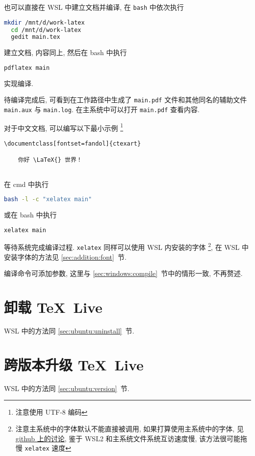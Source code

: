 也可以直接在 WSL 中建立文档并编译,
在 \texttt{bash} 中依次执行
\begin{lstlisting}[language=bash]
  mkdir /mnt/d/work-latex
  cd /mnt/d/work-latex
  gedit main.tex
\end{lstlisting}
建立文档,
内容同上,
然后在 \textsf{bash} 中执行
\begin{lstlisting}[language=bash]
  pdflatex main
\end{lstlisting}
实现编译.

待编译完成后, 可看到在工作路径中生成了 \texttt{main.pdf}
文件和其他同名的辅助文件 \texttt{main.aux} 与 \texttt{main.log}.
在主系统中可以打开 \texttt{main.pdf} 查看内容.

对于中文文档,
可以编写以下最小示例%
\footnote{注意使用 UTF-8 编码}%
\begin{lstlisting}[language={[LaTeX]TeX}]
  \documentclass[fontset=fandol]{ctexart}
  
    你好 \LaTeX{} 世界！
  
\end{lstlisting}
在 \textsf{cmd} 中执行
\begin{lstlisting}[language=bash]
  bash -l -c "xelatex main"
\end{lstlisting}
或在 \textsf{bash} 中执行
\begin{lstlisting}[language=bash]
  xelatex main
\end{lstlisting}
等待系统完成编译过程. 
\texttt{xelatex} 同样可以使用 WSL 内安装的字体%
\footnote{注意主系统中的字体默认不能直接被调用,
如果打算使用主系统中的字体,
见
\href{https://github.com/OsbertWang/install-latex-guide-zh-cn/issues/14}{github 上的讨论},
鉴于 WSL2 和主系统文件系统互访速度慢,
该方法很可能拖慢 \texttt{xelatex} 速度},
在 WSL 中安装字体的方法见 \ref{sec:addition:font}~节.

编译命令可添加参数, 这里与 \ref{sec:windows:compile}~节中的情形一致, 不再赘述.

\section{卸载 \TeX\ Live}

WSL 中的方法同 \ref{sec:ubuntu:uninstall}~节.

\section{跨版本升级 \TeX\ Live}

WSL 中的方法同 \ref{sec:ubuntu:version}~节.
